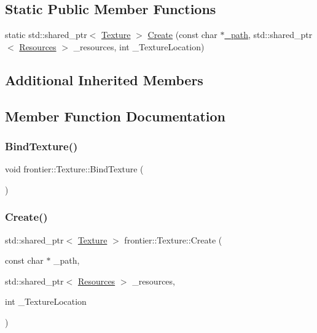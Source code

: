 \subsection*{Static Public Member Functions}
\begin{DoxyCompactItemize}
\item 
static std\+::shared\+\_\+ptr$<$ \hyperlink{classfrontier_1_1_texture}{Texture} $>$ \hyperlink{classfrontier_1_1_texture_af6a68fb852e7cc7eec626d4c69f3d76a}{Create} (const char $\ast$\hyperlink{classfrontier_1_1_resource_a69fe22a83fc57a08efd043e2c37edf7a}{\+\_\+path}, std\+::shared\+\_\+ptr$<$ \hyperlink{classfrontier_1_1_resources}{Resources} $>$ \+\_\+resources, int \+\_\+\+Texture\+Location)
\end{DoxyCompactItemize}
\subsection*{Additional Inherited Members}


\subsection{Member Function Documentation}
\mbox{\label{classfrontier_1_1_texture_ae983ce4ddd78a5170e3beed65b17ae3f}} 
\subsubsection{\texorpdfstring{Bind\+Texture()}{BindTexture()}}
{\footnotesize\ttfamily void frontier\+::\+Texture\+::\+Bind\+Texture (\begin{DoxyParamCaption}{ }\end{DoxyParamCaption})}

\mbox{\label{classfrontier_1_1_texture_af6a68fb852e7cc7eec626d4c69f3d76a}} 
\subsubsection{\texorpdfstring{Create()}{Create()}}
{\footnotesize\ttfamily std\+::shared\+\_\+ptr$<$ \hyperlink{classfrontier_1_1_texture}{Texture} $>$ frontier\+::\+Texture\+::\+Create (\begin{DoxyParamCaption}\item[{const char $\ast$}]{\+\_\+path,  }\item[{std\+::shared\+\_\+ptr$<$ \hyperlink{classfrontier_1_1_resources}{Resources} $>$}]{\+\_\+resources,  }\item[{int}]{\+\_\+\+Texture\+Location }\end{DoxyParamCaption})\hspace{0.3cm}{\ttfamily [static]}}

